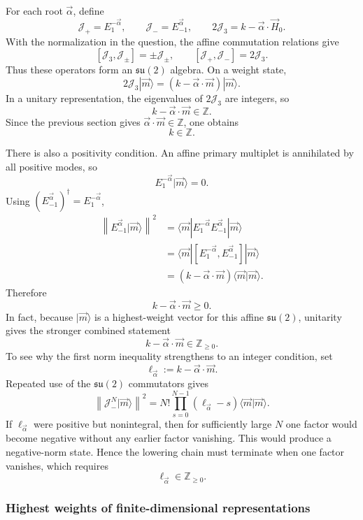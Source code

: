 \documentclass[
  10pt,
  a4paper,
  openany]{book}
\begin{document}
For each root \(\vec\alpha\), define \[
\mathcal J_+=E_1^{-\vec\alpha},
\qquad
\mathcal J_-=E_{-1}^{\vec\alpha},
\qquad
2\mathcal J_3=k-\vec\alpha\cdot\vec H_0.
\] With the normalization in the question, the affine commutation
relations give \[
[\mathcal J_3,\mathcal J_\pm]=\pm\mathcal J_\pm,
\qquad
[\mathcal J_+,\mathcal J_-]=2\mathcal J_3.
\] Thus these operators form an \(\mathfrak{su}(2)\) algebra. On a
weight state, \[
2\mathcal J_3|\vec m\rangle
=(k-\vec\alpha\cdot\vec m)|\vec m\rangle.
\] In a unitary representation, the eigenvalues of \(2\mathcal J_3\) are
integers, so \[
k-\vec\alpha\cdot\vec m\in\mathbb Z.
\] Since the previous section gives
\(\vec\alpha\cdot\vec m\in\mathbb Z\), one obtains \[
k\in\mathbb Z.
\]

There is also a positivity condition. An affine primary multiplet is
annihilated by all positive modes, so \[
E_1^{-\vec\alpha}|\vec m\rangle=0.
\] Using \((E_{-1}^{\vec\alpha})^\dagger=E_1^{-\vec\alpha}\), \[
\begin{aligned}
\left\|E_{-1}^{\vec\alpha}|\vec m\rangle\right\|^2
&=\langle\vec m|E_1^{-\vec\alpha}E_{-1}^{\vec\alpha}|\vec m\rangle\\
&=\langle\vec m|[E_1^{-\vec\alpha},E_{-1}^{\vec\alpha}]|\vec m\rangle\\
&=(k-\vec\alpha\cdot\vec m)\langle\vec m|\vec m\rangle.
\end{aligned}
\] Therefore \[
k-\vec\alpha\cdot\vec m\geq0.
\] In fact, because \(|\vec m\rangle\) is a highest-weight vector for
this affine \(\mathfrak{su}(2)\), unitarity gives the stronger combined
statement \[
k-\vec\alpha\cdot\vec m\in\mathbb Z_{\geq0}.
\] To see why the first norm inequality strengthens to an integer
condition, set \[
\ell_{\vec\alpha}:=k-\vec\alpha\cdot\vec m.
\] Repeated use of the \(\mathfrak{su}(2)\) commutators gives \[
\left\|\mathcal J_-^N|\vec m\rangle\right\|^2
=N!\prod_{s=0}^{N-1}(\ell_{\vec\alpha}-s)
\langle\vec m|\vec m\rangle.
\] If \(\ell_{\vec\alpha}\) were positive but nonintegral, then for
sufficiently large \(N\) one factor would become negative without any
earlier factor vanishing. This would produce a negative-norm state.
Hence the lowering chain must terminate when one factor vanishes, which
requires \[
\ell_{\vec\alpha}\in\mathbb Z_{\geq0}.
\]

\subsubsection{Highest weights of finite-dimensional
representations}\label{highest-weights-of-finite-dimensional-representations}
\end{document}

